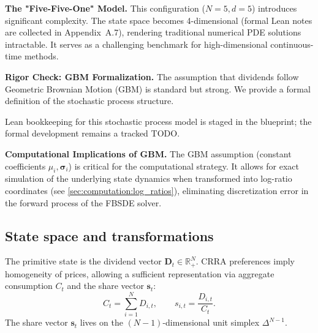 \documentclass[11pt,letterpaper,oneside]{article}
\numberwithin{equation}{section}
\newcommand{\R}{\mathbb{R}}
\newcommand{\1}{\mathbf{1}}
\begin{document}
\begin{tcolorbox}[didacticstyle]
  	\textbf{The "Five-Five-One" Model.} This configuration ($N=5, d=5$) introduces significant complexity. The state space becomes 4-dimensional (formal Lean notes are collected in Appendix~A.7), rendering traditional numerical PDE solutions intractable. It serves as a challenging benchmark for high-dimensional continuous-time methods.

\begin{tcolorbox}[mathstyle]
  	\textbf{Rigor Check: GBM Formalization.} The assumption that dividends follow Geometric Brownian Motion (GBM) is standard but strong. We provide a formal definition of the stochastic process structure.
  \begin{leanproof}[title={Definition: Geometric Brownian Motion Structure}]
  Lean bookkeeping for this stochastic process model is staged in the blueprint; the
  formal development remains a tracked TODO.
  \end{leanproof}
    
  	\textbf{Computational Implications of GBM.} The GBM assumption (constant coefficients $\mu_i, \bm{\sigma}_i$) is critical for the computational strategy. It allows for exact simulation of the underlying state dynamics when transformed into log-ratio coordinates (see \cref{sec:computation:log_ratios}), eliminating discretization error in the forward process of the FBSDE solver.

\end{tcolorbox}
\end{tcolorbox}
\subsection{State space and transformations}
The primitive state is the dividend vector $\bm{D}_t\in\R_+^N$. CRRA preferences imply homogeneity of prices, allowing a sufficient representation via aggregate consumption $C_t$ and the share vector $\bm{s}_t$:
\begin{equation}\label{eq:state_transform}
  C_t=\sum_{i=1}^N D_{i,t}, \qquad s_{i,t}=\frac{D_{i,t}}{C_t}.
\end{equation}
The share vector $\bm{s}_t$ lives on the $(N-1)$-dimensional unit simplex $\Delta^{N-1}$.
\end{document}
